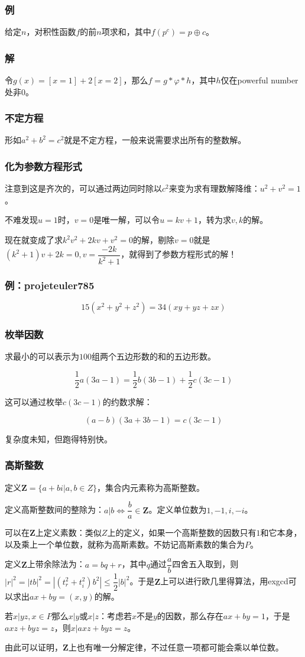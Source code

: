 \documentclass[10pt]{beamer}
\begin{document}
	\begin{frame}
		\frametitle{例}

		给定$n$，对积性函数$f$的前$n$项求和，其中$f(p^c)=p\oplus c$。
	
	\end{frame}
	\begin{frame}
		\frametitle{解}
	
		令$g(x)=[x=1]+2[x=2]$，那么$f=g*\varphi*h$，其中$h$仅在powerful number处非0。
	
	\end{frame}
	\begin{frame}
		\frametitle{不定方程}

		形如$a^2+b^2=c^2$就是不定方程，一般来说需要求出所有的整数解。
	
	\end{frame}
	\begin{frame}
		\frametitle{化为参数方程形式}
	
		注意到这是齐次的，可以通过两边同时除以$c^2$来变为求有理数解降维：$u^2+v^2=1$。

		不难发现$u=1$时，$v=0$是唯一解，可以令$u=kv+1$，转为求$v,k$的解。

		现在就变成了求$k^2v^2+2kv+v^2=0$的解，剔除$v=0$就是$(k^2+1)v+2k=0,v=\dfrac{-2k}{k^2+1}$，就得到了参数方程形式的解！
	
	\end{frame}
	\begin{frame}
		\frametitle{例：projeteuler785}
	
		$$15  (x^2 + y^2 + z^2) = 34  (xy + yz + zx)$$
	
	\end{frame}
	\begin{frame}
		\frametitle{枚举因数}
	
		求最小的可以表示为$100$组两个五边形数的和的五边形数。

		$$
		\dfrac{1}{2}a(3a-1)=\dfrac{1}{2}b(3b-1)+\dfrac{1}{2}c(3c-1)
		$$

		这可以通过枚举$c(3c-1)$的约数求解：

		$$
		(a-b)(3a+3b-1)=c(3c-1)
		$$

		复杂度未知，但跑得特别快。
	
	\end{frame}
	\begin{frame}
		\frametitle{高斯整数}
	
		定义$\mathbf Z=\{a+bi|a,b\in Z\}$，集合内元素称为高斯整数。

		定义高斯整数间的整除为：$a|b\Leftrightarrow \dfrac ba\in \mathbf Z$。定义单位数为$1,-1,i,-i$。

		可以在$\mathbf Z$上定义素数：类似$Z$上的定义，如果一个高斯整数的因数只有$1$和它本身，以及乘上一个单位数，就称为高斯素数。不妨记高斯素数的集合为$P$。

		定义$\mathbf Z$上带余除法为：$a=bq+r$，其中$q$通过$\dfrac ab$四舍五入取到，则$|r|^2=|tb|^2=|(t_r^2+t_i^2)b^2|\le \dfrac 12|b|^2$。于是$\mathbf Z$上可以进行欧几里得算法，用exgcd可以求出$ax+by=(x,y)$的解。

		若$x|yz,x\in P$那么$x|y$或$x|z$：考虑若$x$不是$y$的因数，那么存在$ax+by=1$，于是$axz+byz=z$，则$x|axz+byz=z$。

		由此可以证明，$\mathbf Z$上也有唯一分解定律，不过任意一项都可能会乘以单位数。
	\end{frame}
\end{document}
